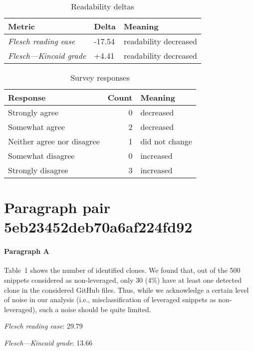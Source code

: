 \bigskip\begin{table}[!h]
\centering
\begin{tabular}{lll}
\toprule
               \textbf{Metric} & \textbf{Delta} &       \textbf{Meaning} \\
\midrule
    \emph{Flesch reading ease} &         -17.54 &  readability decreased \\
 \emph{Flesch---Kincaid grade} &          +4.41 &  readability decreased \\
\bottomrule
\end{tabular}
\caption*{Readability deltas}\end{table}

\begin{table}[!h]
\centering
\begin{tabular}{lrl}
\toprule
          \textbf{Response} &  \textbf{Count} & \textbf{Meaning} \\
\midrule
             Strongly agree &               0 &        decreased \\
             Somewhat agree &               2 &        decreased \\
 Neither agree nor disagree &               1 &   did not change \\
          Somewhat disagree &               0 &        increased \\
          Strongly disagree &               3 &        increased \\
\bottomrule
\end{tabular}
\caption*{Survey responses}\end{table}


\newpage
\section{Paragraph pair 5eb23452deb70a6af224fd92}
\paragraph{Paragraph A}
Table 1 shows the number of identified clones. We found that, out of the 500 snippets considered as non-leveraged, only 30 (4\%) have at least one detected clone in the considered GitHub files. Thus, while we acknowledge a certain level of noise in our analysis (i.e., misclassification of leveraged snippets as non-leveraged), such a noise should be quite limited.\par\medskip
\emph{Flesch reading ease}: 29.79\par
\emph{Flesch---Kincaid grade}: 13.66


